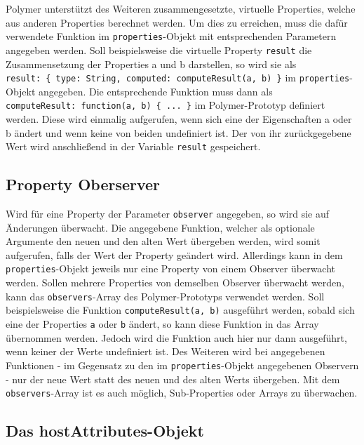 Polymer unterstützt des Weiteren zusammengesetzte, virtuelle Properties,
welche aus anderen Properties berechnet werden. Um dies zu erreichen,
muss die dafür verwendete Funktion im \texttt{properties}-Objekt mit
entsprechenden Parametern angegeben werden. Soll beispielsweise die
virtuelle Property \texttt{result} die Zusammensetzung der Properties a
und b darstellen, so wird sie als
\texttt{result:\ \{\ type:\ String,\ computed:\ computeResult(a,\ b)\ \}}
im \texttt{properties}-Objekt angegeben. Die entsprechende Funktion muss
dann als \texttt{computeResult:\ function(a,\ b)\ \{\ ...\ \}} im
Polymer-Prototyp definiert werden. Diese wird einmalig aufgerufen, wenn
sich eine der Eigenschaften a oder b ändert und wenn keine von beiden
undefiniert ist. Der von ihr zurückgegebene Wert wird anschließend in
der Variable \texttt{result} gespeichert.

\subsection{Property Oberserver}\label{property-oberserver}

Wird für eine Property der Parameter \texttt{observer} angegeben, so
wird sie auf Änderungen überwacht. Die angegebene Funktion, welcher als
optionale Argumente den neuen und den alten Wert übergeben werden, wird
somit aufgerufen, falls der Wert der Property geändert wird. Allerdings
kann in dem \texttt{properties}-Objekt jeweils nur eine Property von
einem Observer überwacht werden. Sollen mehrere Properties von demselben
Observer überwacht werden, kann das \texttt{observers}-Array des
Polymer-Prototyps verwendet werden. Soll beispielsweise die Funktion
\texttt{computeResult(a,\ b)} ausgeführt werden, sobald sich eine der
Properties \texttt{a} oder \texttt{b} ändert, so kann diese Funktion in
das Array übernommen werden. Jedoch wird die Funktion auch hier nur dann
ausgeführt, wenn keiner der Werte undefiniert ist. Des Weiteren wird bei
angegebenen Funktionen - im Gegensatz zu den im
\texttt{properties}-Objekt angegebenen Observern - nur der neue Wert
statt des neuen und des alten Werts übergeben. Mit dem
\texttt{observers}-Array ist es auch möglich, Sub-Properties oder Arrays
zu überwachen.

\subsection{Das hostAttributes-Objekt}\label{das-hostattributes-objekt}

